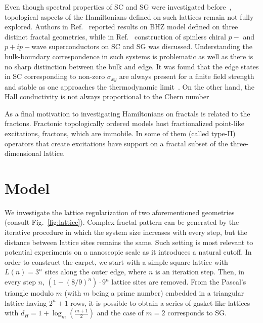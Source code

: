 {Even though spectral properties of SC and SG were investigated before~\cite{GHEZ19871291,PhysRevB.29.5504, PhysRevLett.49.1194, PhysRevB.60.10054}, topological aspects of the Hamiltonians defined on such lattices remain not fully explored. Authors in Ref.~\cite{2018:BHZ} reported results on BHZ model defined on three distinct fractal geometries, while in Ref.~\cite{PaiFractal2019} construction of spinless chiral $p-$ and $p +ip-$wave superconductors on SC and SG was discussed. Understanding the bulk-boundary correspondence in such systems is problematic as well as there is no sharp distinction between the bulk and edge. It was found that the edge states in SC corresponding to non-zero $\sigma_{xy}$ are always present for a finite field strength and stable as one approaches the thermodynamic limit~\cite{EdgesFremling2020}. On the other hand, the Hall conductivity is not always proportional to the Chern number~\cite{KatnelsonFractal2020}

As a final motivation to investigating Hamiltonians on fractals is related to the fractons. Fractonic topologically ordered models host fractionalized point-like excitations, fractons, which are immobile. In some of them (called type-II) operators that create excitations have support on a fractal subset of the three-dimensional lattice.

\section{Model}
\label{sec:frac_model}
We investigate the lattice regularization of two aforementioned geometries (consult Fig.~\ref{fig:lattice}). Complex fractal pattern can be generated by the iterative procedure in which the system size increases with every step, but the distance between lattice sites remains the same. Such setting is most relevant to potential experiments on a nanoscopic scale as it introduces a natural cutoff. In order to construct the carpet, we start with a simple square lattice with $L (n) = 3^n$ sites along the outer edge, where $n$ is an iteration step. Then, in every step $n$, $ \left( 1 - ( 8 /9 )^n \right) \cdot 9^n$ lattice sites are removed. From the Pascal's triangle modulo $m$ (with $m$ being a prime number) embedded in a triangular lattice having $2^n + 1$ rows, it is possible to obtain a series of gasket-like lattices with $d_H = 1 + \log_m \left( \frac{m + 1}{2} \right)$ and the case of $m = 2$ corresponds to SG.

}
